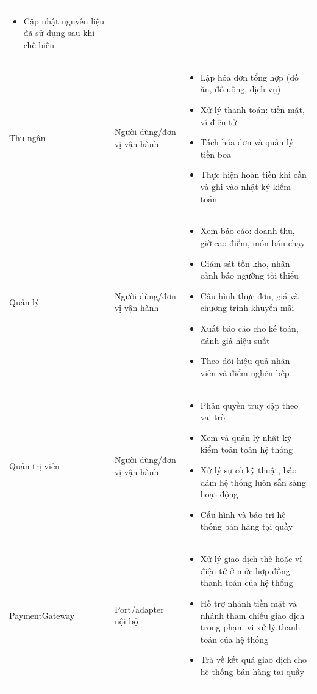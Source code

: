 \begin{longtable}{>{\bfseries\raggedright\arraybackslash}p{2.4cm} >{\bfseries\raggedright\arraybackslash}p{2.8cm} >{\raggedright\arraybackslash}p{9.4cm}}
\begin{itemize}
  \item Cập nhật nguyên liệu đã sử dụng sau khi chế biến
\end{itemize} \\
Thu ngân & Người dùng/đơn vị vận hành & \begin{itemize}
  \item Lập hóa đơn tổng hợp (đồ ăn, đồ uống, dịch vụ)
  \item Xử lý thanh toán: tiền mặt, ví điện tử
  \item Tách hóa đơn và quản lý tiền boa
  \item Thực hiện hoàn tiền khi cần và ghi vào nhật ký kiểm toán
\end{itemize} \\
Quản lý & Người dùng/đơn vị vận hành & \begin{itemize}
  \item Xem báo cáo: doanh thu, giờ cao điểm, món bán chạy
  \item Giám sát tồn kho, nhận cảnh báo ngưỡng tối thiểu
  \item Cấu hình thực đơn, giá và chương trình khuyến mãi
  \item Xuất báo cáo cho kế toán, đánh giá hiệu suất
  \item Theo dõi hiệu quả nhân viên và điểm nghẽn bếp
\end{itemize} \\
Quản trị viên & Người dùng/đơn vị vận hành & \begin{itemize}
  \item Phân quyền truy cập theo vai trò
  \item Xem và quản lý nhật ký kiểm toán toàn hệ thống
  \item Xử lý sự cố kỹ thuật, bảo đảm hệ thống luôn sẵn sàng hoạt động
  \item Cấu hình và bảo trì hệ thống bán hàng tại quầy
\end{itemize} \\
\textsf{PaymentGateway} & Port/adapter nội bộ & \begin{itemize}
  \item Xử lý giao dịch thẻ hoặc ví điện tử ở mức hợp đồng thanh toán của hệ thống
  \item Hỗ trợ nhánh tiền mặt và nhánh tham chiếu giao dịch trong phạm vi xử lý thanh toán của hệ thống
  \item Trả về kết quả giao dịch cho hệ thống bán hàng tại quầy
\end{itemize} \\
\end{longtable}

